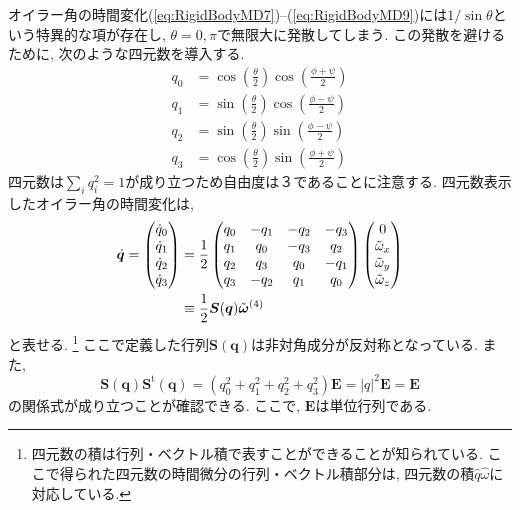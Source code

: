 オイラー角の時間変化(\ref{eq:RigidBodyMD7})--(\ref{eq:RigidBodyMD9})には$1/\sin \theta$という特異的な項が存在し, $\theta = 0, \pi$で無限大に発散してしまう.
この発散を避けるために, 次のような四元数を導入する. 
\begin{align}
 q_0 & = \cos\left(\frac{\theta}{2}\right)\cos\left(\frac{\phi+\psi}{2}\right)
 \label{eq:RigidBodyMD10}
 \\
 q_1 & = \sin\left(\frac{\theta}{2}\right)\cos\left(\frac{\phi-\psi}{2}\right)
 \label{eq:RigidBodyMD11}
 \\
 q_2 & = \sin\left(\frac{\theta}{2}\right)\sin\left(\frac{\phi-\psi}{2}\right)
\label{eq:RigidBodyMD12}
 \\
 q_3 & = \cos\left(\frac{\theta}{2}\right)\sin\left(\frac{\phi+\psi}{2}\right) 
\label{eq:RigidBodyMD13}
\end{align}
四元数は$\sum_{i}q_{i}^{2}=1$が成り立つため自由度は３であることに注意する.
四元数表示したオイラー角の時間変化は, 
\begin{align}
 \dot{\bm{q}}
  =
  \begin{pmatrix}
    \dot{q}_{0} \\ \dot{q}_{1} \\ \dot{q}_{2} \\ \dot{q}_{3}
  \end{pmatrix}
  &=
  \frac{1}{2}
    \begin{pmatrix}
     q_{0} & -q_{1} & -q_{2} & -q_{3} \\
     q_{1} &  q_{0} & -q_{3} &  q_{2} \\
     q_{2} &  q_{3} &  q_{0} & -q_{1} \\
     q_{3} & -q_{2} &  q_{1} &  q_{0} \\
    \end{pmatrix}
 \begin{pmatrix}
  0                  \\
  \Tilde{\omega}_{x} \\
  \Tilde{\omega}_{y} \\
  \Tilde{\omega}_{z} \\
 \end{pmatrix}
\label{eq:RigidBodyMD14}
 \\
 &\equiv
 \frac{1}{2} \bm{S}(\bm{q}) \Tilde{\bm{\bm{\omega}}}^{(4)}
\label{eq:RigidBodyMD15}
\end{align}
と表せる.
\footnote{四元数の積は行列・ベクトル積で表すことができることが知られている. ここで得られた四元数の時間微分の行列・ベクトル積部分は, 四元数の積$\hat{q}\hat{\omega}$に対応している.}
ここで定義した行列$\bm{S}(\bm{q})$は非対角成分が反対称となっている. また,
\begin{equation}
\bm{S}(\bm{q})\bm{S}^{\mathrm{t}}(\bm{q})
 =
 (q_{0}^{2} + q_{1}^{2} + q_{2}^{2} + q_{3}^{2}) \bm{E}
 =
 |q|^{2} \bm{E}
 =
 \bm{E}
\label{eq:RigidBodyMD16}
\end{equation}
の関係式が成り立つことが確認できる. ここで, $\bm{E}$は単位行列である.

